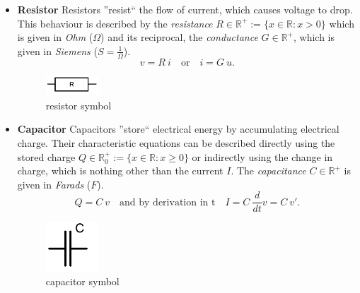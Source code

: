 \begin{itemize}
	\item \textbf{Resistor} \newline
	Resistors ''resist`` the flow of current, which causes voltage to drop. This behaviour is described by the \emph{resistance} $R \in \mathbb{R}^+ := \{x \in \mathbb{R}: x > 0\}$ which is given in \emph{Ohm} ($\Omega$) and its reciprocal, the \emph{conductance} $G \in \mathbb{R}^+$, which is given in \emph{Siemens} ($S=\frac{1}{\Omega}$). 
	\begin{equation}
		\label{eq:resistor law}
		v = R \ i \quad \text{or} \quad i = G \ u.
	\end{equation}
	\begin{figure}[H]
		\label{fig:resistor symbol}
		\centering
		\includegraphics[width=2cm]{pictures/resistor.png}
		\caption{resistor symbol}
	\end{figure}

	\item \textbf{Capacitor} \newline
	Capacitors ''store`` electrical energy by accumulating electrical charge. Their characteristic equations can be described directly using the stored charge $Q \in \mathbb{R}^+_0 := \{x \in \mathbb{R}: x \geq 0\}$ or indirectly using the change in charge, which is nothing other than the current $I$. The \emph{capacitance} $C \in \mathbb{R}^+$ is given in \emph{Farads} ($F$).
	\begin{equation}
		\label{eq:capacitor law}
		Q = C \ v \quad \text{and by derivation in t} \quad I = C \ \frac{d}{dt}v = C \ v'.
	\end{equation}
	\begin{figure}[H]
		\label{fig:capacitor symbol}
		\centering
		\includegraphics[width=2cm]{pictures/capacitor.png}
		\caption{capacitor symbol}
	\end{figure}


\end{itemize}
